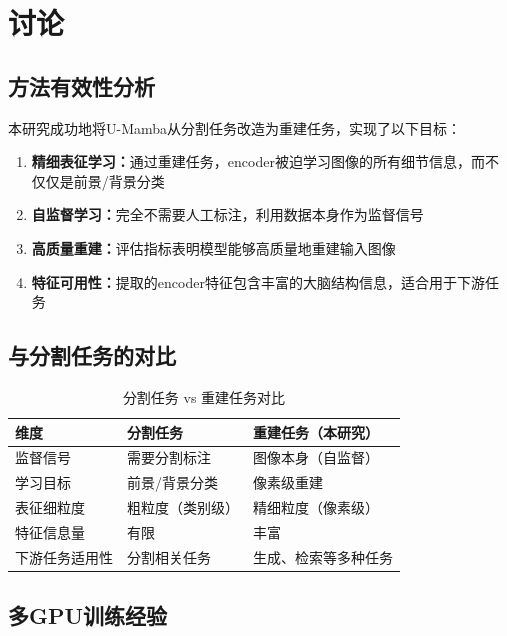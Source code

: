 \documentclass[11pt,a4paper]{article}
\begin{document}
\section{讨论}

\subsection{方法有效性分析}

本研究成功地将U-Mamba从分割任务改造为重建任务，实现了以下目标：

\begin{enumerate}
    \item \textbf{精细表征学习：}通过重建任务，encoder被迫学习图像的所有细节信息，而不仅仅是前景/背景分类

    \item \textbf{自监督学习：}完全不需要人工标注，利用数据本身作为监督信号

    \item \textbf{高质量重建：}评估指标表明模型能够高质量地重建输入图像

    \item \textbf{特征可用性：}提取的encoder特征包含丰富的大脑结构信息，适合用于下游任务
\end{enumerate}

\subsection{与分割任务的对比}

\begin{table}[htbp]
    \centering
    \caption{分割任务 vs 重建任务对比}
    \label{tab:comparison}
    \begin{tabular}{lll}
        \toprule
        \textbf{维度} & \textbf{分割任务} & \textbf{重建任务（本研究）} \\
        \midrule
        监督信号 & 需要分割标注 & 图像本身（自监督） \\
        学习目标 & 前景/背景分类 & 像素级重建 \\
        表征细粒度 & 粗粒度（类别级） & 精细粒度（像素级） \\
        特征信息量 & 有限 & 丰富 \\
        下游任务适用性 & 分割相关任务 & 生成、检索等多种任务 \\
        \bottomrule
    \end{tabular}
\end{table}

\subsection{多GPU训练经验}
\end{document}
